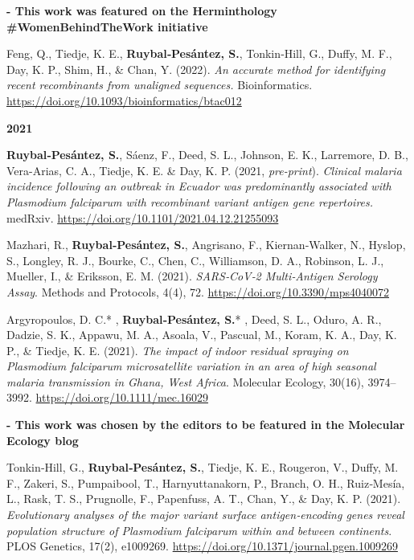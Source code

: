 \documentclass[11pt,a4paper,]{awesome-cv}
\begin{document}
\setlength{\leftskip}{2cm}

\textbf{- This work was featured on the Herminthology
\#WomenBehindTheWork initiative
\href{https://facebook.com/102760015458811/posts/151514423916703/?d=n}{\faExternalLink}}

Feng, Q., Tiedje, K. E., \textbf{Ruybal‐Pesántez, S.}, Tonkin‐Hill, G.,
Duffy, M. F., Day, K. P., Shim, H., \& Chan, Y. (2022). \emph{An
accurate method for identifying recent recombinants from unaligned
sequences.} Bioinformatics.
\url{https://doi.org/10.1093/bioinformatics/btac012}

\setlength{\leftskip}{0cm}

\textbf{2021}

\setlength{\leftskip}{1cm}

\textbf{Ruybal‐Pesántez, S.}, Sáenz, F., Deed, S. L., Johnson, E. K.,
Larremore, D. B., Vera-Arias, C. A., Tiedje, K. E. \& Day, K. P. (2021,
\emph{pre-print}). \emph{Clinical malaria incidence following an
outbreak in Ecuador was predominantly associated with Plasmodium
falciparum with recombinant variant antigen gene repertoires.} medRxiv.
\url{https://doi.org/10.1101/2021.04.12.21255093}

Mazhari, R., \textbf{Ruybal‐Pesántez, S.}, Angrisano, F.,
Kiernan‐Walker, N., Hyslop, S., Longley, R. J., Bourke, C., Chen, C.,
Williamson, D. A., Robinson, L. J., Mueller, I., \& Eriksson, E. M.
(2021). \emph{SARS‐CoV‐2 Multi‐Antigen Serology Assay}. Methods and
Protocols, 4(4), 72. \url{https://doi.org/10.3390/mps4040072}

Argyropoulos, D. C.* , \textbf{Ruybal‐Pesántez, S.}* , Deed, S. L.,
Oduro, A. R., Dadzie, S. K., Appawu, M. A., Asoala, V., Pascual, M.,
Koram, K. A., Day, K. P., \& Tiedje, K. E. (2021). \emph{The impact of
indoor residual spraying on Plasmodium falciparum microsatellite
variation in an area of high seasonal malaria transmission in Ghana,
West Africa}. Molecular Ecology, 30(16), 3974--3992.
\url{https://doi.org/10.1111/mec.16029}

\setlength{\leftskip}{2cm}

\textbf{- This work was chosen by the editors to be featured in the
Molecular Ecology blog
\href{https://molecularecologyblog.com/2021/09/01/interview-with-the-authors-does-indoor-spraying-alter-the-genetic-diversity-of-malaria-causing-parasites-and-what-does-this-mean-for-long-term-control/}{\faExternalLink}}

\setlength{\leftskip}{1cm}

Tonkin‐Hill, G., \textbf{Ruybal‐Pesántez, S.}, Tiedje, K. E., Rougeron,
V., Duffy, M. F., Zakeri, S., Pumpaibool, T., Harnyuttanakorn, P.,
Branch, O. H., Ruiz‐Mesía, L., Rask, T. S., Prugnolle, F., Papenfuss, A.
T., Chan, Y., \& Day, K. P. (2021). \emph{Evolutionary analyses of the
major variant surface antigen‐encoding genes reveal population structure
of Plasmodium falciparum within and between continents}. PLOS Genetics,
17(2), e1009269. \url{https://doi.org/10.1371/journal.pgen.1009269}
\end{document}
